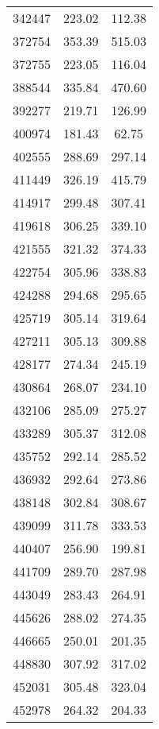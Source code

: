 \documentclass[main.tex]{subfiles}
\begin{document}
\begin{longtable}{ccc}
		342447     & 223.02       & 112.38       \\
		372754     & 353.39       & 515.03       \\
		372755     & 223.05       & 116.04       \\
		388544     & 335.84       & 470.60       \\
		392277     & 219.71       & 126.99       \\
		400974     & 181.43       & 62.75        \\
		402555     & 288.69       & 297.14       \\
		411449     & 326.19       & 415.79       \\
		414917     & 299.48       & 307.41       \\
		419618     & 306.25       & 339.10       \\
		421555     & 321.32       & 374.33       \\
		422754     & 305.96       & 338.83       \\
		424288     & 294.68       & 295.65       \\
		425719     & 305.14       & 319.64       \\
		427211     & 305.13       & 309.88       \\
		428177     & 274.34       & 245.19       \\
		430864     & 268.07       & 234.10       \\
		432106     & 285.09       & 275.27       \\
		433289     & 305.37       & 312.08       \\
		435752     & 292.14       & 285.52       \\
		436932     & 292.64       & 273.86       \\
		438148     & 302.84       & 308.67       \\
		439099     & 311.78       & 333.53       \\
		440407     & 256.90       & 199.81       \\
		441709     & 289.70       & 287.98       \\
		443049     & 283.43       & 264.91       \\
		445626     & 288.02       & 274.35       \\
		446665     & 250.01       & 201.35       \\
		448830     & 307.92       & 317.02       \\
		452031     & 305.48       & 323.04       \\
		452978     & 264.32       & 204.33       \\

\end{longtable}
\end{document}

